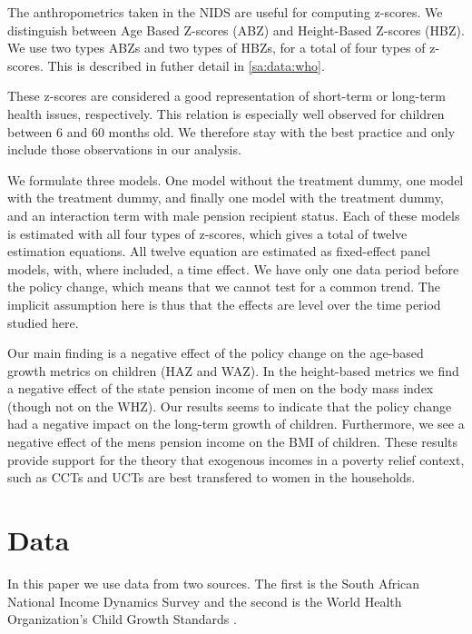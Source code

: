 \begin{refsection}
The anthropometrics taken in the NIDS are useful for computing z-scores.
We distinguish between Age Based Z-scores (ABZ) and Height-Based Z-scores (HBZ).
We use two types ABZs and two types of HBZs, for a total of four types of z-scores.
This is described in futher detail in \autoref{sa:data:who}.

These z-scores are considered a good representation of short-term or long-term health issues, respectively.
This relation is especially well observed for children between 6 and 60 months old.
We therefore stay with the best practice and only include those observations in our analysis.

We formulate three models. One model without the treatment dummy,
one model with the treatment dummy, and finally one model with the treatment dummy,
and an interaction term with male pension recipient status.
Each of these models is estimated with all four types of z-scores,
which gives a total of twelve estimation equations.
All twelve equation are estimated as fixed-effect panel models, with, where included, a time effect.
We have only one data period before the policy change, which means that we cannot test for a common trend.
The implicit assumption here is thus that the effects are level over the time period studied here.

Our main finding is a negative effect of the policy change on the age-based growth metrics on children (HAZ and WAZ).
In the height-based metrics we find a negative effect of the state pension income of men on the body mass index (though not on the WHZ).
Our results seems to indicate that the policy change had a negative impact on the long-term growth of children.
Furthermore, we see a negative effect of the mens pension income on the BMI of children.
These results provide support for the theory that exogenous incomes in a poverty relief context,
such as CCTs and UCTs are best transfered to women in the households.

\section{Data}
\label{sa:data}
In this paper we use data from two sources.
The first is the South African National Income Dynamics Survey \parencite[NIDS][]{saldru2008nids, saldru2012nids, saldru2013nids} and the second is the World Health Organization's Child Growth Standards \parencite[WHO]{who2006child}.


\end{refsection}
